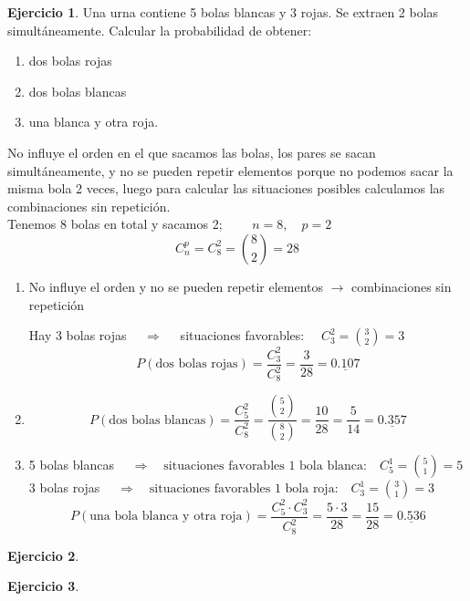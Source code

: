 \documentclass[a4paper, 12pt]{article}
\theoremstyle{definition}
\newtheorem{ej}{Ejercicio}
\begin{document}
\begin{ej}
Una urna contiene 5 bolas blancas y 3 rojas. Se extraen 2 bolas simultáneamente. Calcular la
probabilidad de obtener:
\begin{enumerate}[label=\textit{\alph*)}]
\item dos bolas rojas
\item dos bolas blancas
\item una blanca y otra roja.
\end{enumerate}

No influye el orden en el que sacamos las bolas, los pares se sacan simultáneamente, y no se pueden repetir elementos porque no podemos sacar la misma bola 2 veces, luego para calcular las situaciones posibles calculamos las combinaciones sin repetición. \\
Tenemos 8 bolas en total y sacamos 2; $\qquad n=8 , \quad p=2$
\[C^p_n = C^2_8 = \binom{8}{2} = 28\]
\begin{enumerate}[label=\textit{\alph*)}]
\item No influye el orden y no se pueden repetir elementos $\longrightarrow$ combinaciones sin repetición

Hay 3 bolas rojas $\quad\Longrightarrow\quad$ situaciones favorables: $\quad C_3^2 = \binom{3}{2} = 3$
\[P(\text{dos bolas rojas}) = \frac{C_3^2}{C_8^2} = \frac{3}{28} = \underline{0.107}\]
\item \[P(\text{dos bolas blancas}) = \frac{C_5^2}{C_8^2} = \frac{\binom{5}{2}}{\binom{8}{2}} = \frac{10}{28} = \frac{5}{14} = \underline{0.357}\]
\item 5 bolas blancas $\quad\Longrightarrow\quad \text{situaciones favorables 1 bola blanca:}\quad C_5^1 = \binom{5}{1} = 5$ \\
3 bolas rojas $\quad\Longrightarrow\quad \text{situaciones favorables 1 bola roja:}\quad C_3^1 = \binom{3}{1} = 3$
\[P(\text{una bola blanca y otra roja}) = \frac{C_5^2 \cdot C_3^2}{C_8^2} = \frac{5\cdot3}{28} = \frac{15}{28} = \underline{0.536}\]
\end{enumerate}

\end{ej}

\medskip

\begin{ej}
\end{ej}

\begin{ej}
\end{ej}

\medskip
\end{document}
